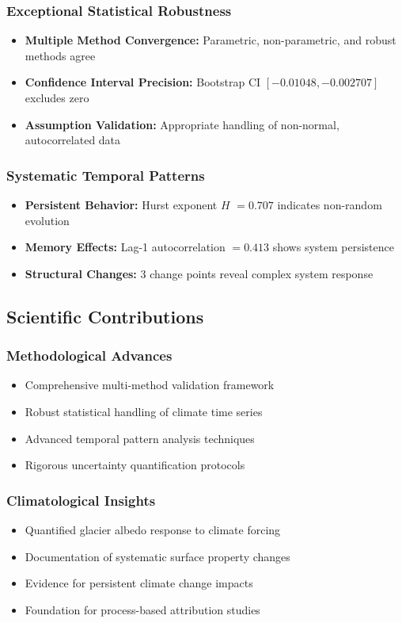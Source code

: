 \documentclass[12pt,a4paper]{article}
\newcommand{\hurst}{$H$}
\begin{document}
\subsubsection{Exceptional Statistical Robustness}
\begin{itemize}
    \item \textbf{Multiple Method Convergence:} Parametric, non-parametric, and robust methods agree
    \item \textbf{Confidence Interval Precision:} Bootstrap CI $[-0.01048, -0.002707]$ excludes zero
    \item \textbf{Assumption Validation:} Appropriate handling of non-normal, autocorrelated data
\end{itemize}

\subsubsection{Systematic Temporal Patterns}
\begin{itemize}
    \item \textbf{Persistent Behavior:} Hurst exponent \hurst{} $= 0.707$ indicates non-random evolution
    \item \textbf{Memory Effects:} Lag-1 autocorrelation $= 0.413$ shows system persistence
    \item \textbf{Structural Changes:} 3 change points reveal complex system response
\end{itemize}

\subsection{Scientific Contributions}

\subsubsection{Methodological Advances}
\begin{itemize}
    \item Comprehensive multi-method validation framework
    \item Robust statistical handling of climate time series
    \item Advanced temporal pattern analysis techniques
    \item Rigorous uncertainty quantification protocols
\end{itemize}

\subsubsection{Climatological Insights}
\begin{itemize}
    \item Quantified glacier albedo response to climate forcing
    \item Documentation of systematic surface property changes
    \item Evidence for persistent climate change impacts
    \item Foundation for process-based attribution studies
\end{itemize}
\end{document}
